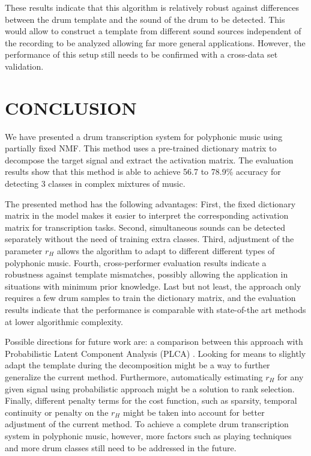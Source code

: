 \documentclass{article}
\begin{document}
These results indicate that this algorithm is relatively robust against differences between the drum template and the sound of the drum to be detected. This would allow to construct a template from different sound sources independent of the recording to be analyzed allowing far more general applications. However, the performance of this setup still needs to be confirmed with a cross-data set validation.

\section{CONCLUSION}\label{sec:Conclusion}

We have presented a drum transcription system for polyphonic music using partially fixed NMF. This method uses a pre-trained dictionary matrix to decompose the target signal and extract the activation matrix. The evaluation results show that this method is able to achieve 56.7 to 78.9\% accuracy for detecting 3 classes in complex mixtures of music. 

The presented method has the following advantages: 
First, the fixed dictionary matrix in the model makes it easier to interpret the corresponding activation matrix for transcription tasks.
Second, simultaneous sounds can be detected separately without the need of training extra classes.  
Third, adjustment of the parameter $r_H$ allows the algorithm to adapt to different different types of polyphonic music. 
Fourth, cross-performer evaluation results indicate a robustness against template mismatches, possibly allowing the application in situations with minimum prior knowledge. 
Last but not least, the approach only requires a few drum samples to train the dictionary matrix, and the evaluation results indicate that the performance is comparable with state-of-the art methods at lower algorithmic complexity. 

Possible directions for future work are: 
a comparison between this approach with Probabilistic Latent Component Analysis (PLCA) \cite{smaragdis_plca_2014}. Looking for means to slightly adapt the template during the decomposition might be a way to further generalize the current method. %
Furthermore, automatically estimating $r_H$ for any given signal using probabilistic approach \cite{ouo_inmf_2010} might be a solution to rank selection. Finally, different penalty terms for the cost function, such as sparsity,  temporal continuity \cite{Virtanen_ssnmf_2007} or penalty on the $r_H$ might be taken into account for better adjustment of the current method. To achieve a complete drum transcription system in polyphonic music, however, more factors such as playing techniques and more drum classes still need to be addressed in the future. 
\end{document}
